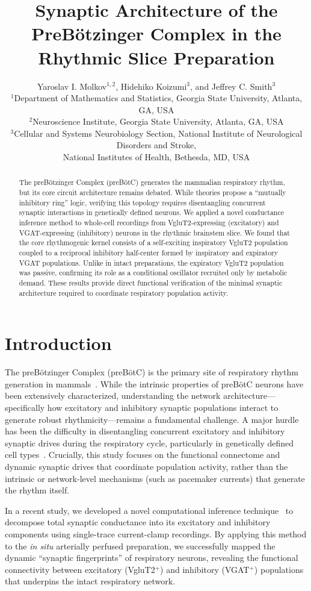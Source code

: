 \documentclass{article}
\title{Synaptic Architecture of the PreBötzinger Complex in the Rhythmic Slice Preparation}
\author{Yaroslav I. Molkov$^{1,2}$, Hidehiko Koizumi$^{3}$, and Jeffrey C. Smith$^{3}$ \\
\small $^{1}$Department of Mathematics and Statistics, Georgia State University, Atlanta, GA, USA \\
\small $^{2}$Neuroscience Institute, Georgia State University, Atlanta, GA, USA \\
\small $^{3}$Cellular and Systems Neurobiology Section, National Institute of Neurological Disorders and Stroke, \\ \small National Institutes of Health, Bethesda, MD, USA}
\date{}
\begin{document}
\maketitle

\begin{abstract}
The preBötzinger Complex (preBötC) generates the mammalian respiratory rhythm, but its core circuit architecture remains debated. While theories propose a ``mutually inhibitory ring'' logic, verifying this topology requires disentangling concurrent synaptic interactions in genetically defined neurons. We applied a novel conductance inference method to whole-cell recordings from VgluT2-expressing (excitatory) and VGAT-expressing (inhibitory) neurons in the rhythmic brainstem slice. We found that the core rhythmogenic kernel consists of a self-exciting inspiratory VgluT2 population coupled to a reciprocal inhibitory half-center formed by inspiratory and expiratory VGAT populations. Unlike in intact preparations, the expiratory VgluT2 population was passive, confirming its role as a conditional oscillator recruited only by metabolic demand. These results provide direct functional verification of the minimal synaptic architecture required to coordinate respiratory population activity.
\end{abstract}

\section{Introduction}

The preBötzinger Complex (preBötC) is the primary site of respiratory rhythm generation in mammals~\citep{smith1991prebotzinger}. While the intrinsic properties of preBötC neurons have been extensively characterized, understanding the network architecture---specifically how excitatory and inhibitory synaptic populations interact to generate robust rhythmicity---remains a fundamental challenge. A major hurdle has been the difficulty in disentangling concurrent excitatory and inhibitory synaptic drives during the respiratory cycle, particularly in genetically defined cell types~\citep{koizumi2013structural}. Crucially, this study focuses on the functional connectome and dynamic synaptic drives that coordinate population activity, rather than the intrinsic or network-level mechanisms (such as pacemaker currents) that generate the rhythm itself.

In a recent study, we developed a novel computational inference technique~\citep{molkov2024inference} to decompose total synaptic conductance into its excitatory and inhibitory components using single-trace current-clamp recordings. By applying this method to the \textit{in situ} arterially perfused preparation, we successfully mapped the dynamic ``synaptic fingerprints'' of respiratory neurons, revealing the functional connectivity between excitatory (VgluT2$^+$) and inhibitory (VGAT$^+$) populations that underpins the intact respiratory network.
\end{document}
